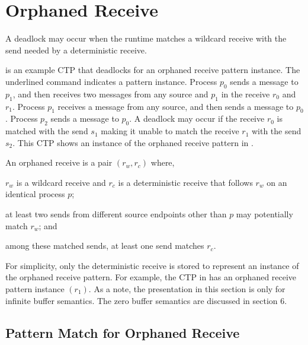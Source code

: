 \section{Orphaned Receive}


\examplefigone

A deadlock may occur when the runtime matches a wildcard receive with the send needed by a deterministic receive. 

 is an example CTP that deadlocks for an orphaned receive pattern instance. The underlined command indicates a pattern instance. Process $p_0$ sends a message to $p_1$, and then receives two messages from any source and $p_1$ in the receive $r_0$ and $r_1$. Process $p_1$ receives a message from any source, and then sends a message to $p_0$. Process $p_2$ sends a message to $p_0$.  
A deadlock may occur if the receive $\mathit{r_{0}}$ is matched with the send $\mathit{s_{1}}$ making it unable to match the receive $\mathit{r_{1}}$ with the send $\mathit{s_{2}}$. 
This CTP shows an instance of the orphaned receive pattern in . 

\begin{definition}
An orphaned receive is a pair $(\mathit{r_w}, \mathit{r_c})$ where, 
\begin{compactenum}
\item $\mathit{r_w}$ is a wildcard receive and $\mathit{r_c}$ is a deterministic receive that follows $\mathit{r_w}$ on an identical process $\mathit{p}$;
\item at least two sends from different source endpoints other than $\mathit{p}$ may potentially match $\mathit{r_w}$; and
\item among these matched sends, at least one send matches $\mathit{r_c}$. 
\end{compactenum}
\label{def:mismatch}
\end{definition}

For simplicity, only the deterministic receive is stored to represent an instance of the orphaned receive pattern. For example, the CTP in  has an orphaned receive pattern instance $(r_1)$.
As a note, the presentation in this section is only for infinite buffer semantics. The zero buffer semantics are discussed in section 6.

\subsection{Pattern Match for Orphaned Receive}

